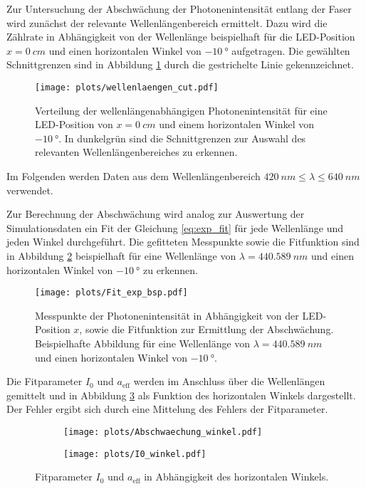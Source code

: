 Zur Untersuchung der Abschwächung der Photonenintensität entlang der Faser wird zunächst der relevante Wellenlängenbereich ermittelt. Dazu wird die Zählrate in Abhängigkeit von der Wellenlänge beispielhaft für die LED-Position $x = \SI{0}{cm}$ und einen horizontalen Winkel von $\SI{-10}{°}$ aufgetragen. Die gewählten Schnittgrenzen sind in Abbildung \ref{fig:wellenlaengen_cut} durch die gestrichelte Linie gekennzeichnet.
\begin{figure}
    \centering
    \texttt{[image: plots/wellenlaengen\_cut.pdf]}
    \caption{Verteilung der wellenlängenabhängigen Photonenintensität für eine LED-Position von $x = \SI{0}{cm}$ und einem horizontalen Winkel von $\SI{-10}{°}$. In dunkelgrün sind die Schnittgrenzen zur Auswahl des relevanten Wellenlängenbereiches zu erkennen.}
    \label{fig:wellenlaengen_cut}
\end{figure}
\FloatBarrier
Im Folgenden werden Daten aus dem Wellenlängenbereich $\SI{420}{nm} \leq \lambda \leq \SI{640}{nm}$ verwendet.

Zur Berechnung der Abschwächung wird analog zur Auswertung der Simulationsdaten ein Fit der Gleichung \eqref{eq:exp_fit} für jede Wellenlänge und jeden Winkel durchgeführt. Die gefitteten Messpunkte sowie die Fitfunktion sind in Abbildung \ref{fig:Fit_exp_bsp} beispielhaft für eine Wellenlänge von $\lambda = \SI{440.589}{nm}$ und einen horizontalen Winkel von $\SI{-10}{°}$ zu erkennen.
\begin{figure}
    \centering
    \texttt{[image: plots/Fit\_exp\_bsp.pdf]}
    \caption{Messpunkte der Photonenintensität in Abhängigkeit von der LED-Position $x$, sowie die Fitfunktion zur Ermittlung der Abschwächung. Beispielhafte Abbildung für eine Wellenlänge von $\lambda = \SI{440.589}{nm}$ und einen horizontalen Winkel von $\SI{-10}{°}$.}
    \label{fig:Fit_exp_bsp}
\end{figure}
\FloatBarrier
Die Fitparameter $I_0$ und $a_\mathrm{eff}$ werden im Anschluss über die Wellenlängen gemittelt und in Abbildung \ref{fig:a_I0_winkel} als Funktion des horizontalen Winkels dargestellt. Der Fehler ergibt sich durch eine Mittelung des Fehlers der Fitparameter.
\begin{figure}
    \begin{subfigure}[c]{0.5\textwidth}    
        \texttt{[image: plots/Abschwaechung\_winkel.pdf]}
    \end{subfigure}
    \begin{subfigure}[c]{0.5\textwidth}
        \texttt{[image: plots/I0\_winkel.pdf]}
    \end{subfigure}
    \caption{Fitparameter $I_0$ und $a_\mathrm{eff}$ in Abhängigkeit des horizontalen Winkels.}
    \label{fig:a_I0_winkel}
\end{figure}


